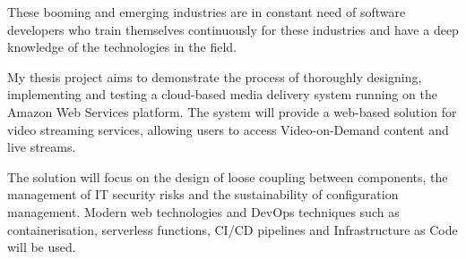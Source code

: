 These booming and emerging industries are in constant need of software developers who train themselves continuously for these industries and have a deep knowledge of the technologies in the field.

My thesis project aims to demonstrate the process of thoroughly designing, implementing and testing a cloud-based media delivery system running on the Amazon Web Services platform. The system will provide a web-based solution for video streaming services, allowing users to access Video-on-Demand content and live streams.

The solution will focus on the design of loose coupling between components, the management of IT security risks and the sustainability of configuration management. Modern web technologies and DevOps techniques such as containerisation, serverless functions, CI/CD pipelines and Infrastructure as Code will be used.

\vfill
\selectthesislanguage

\setcounter{romanPage}{\value{page}}
